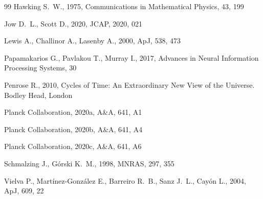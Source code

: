 \documentclass[fleqn,usenatbib]{mnras}
\begin{document}
\begin{thebibliography}{99}
Hawking S.~W.,  1975, Communications in Mathematical Physics, 43, 199

Jow D.~L., Scott D.,  2020, JCAP, 2020, 021

Lewis A., Challinor A., Lasenby A.,  2000, ApJ, 538, 473

Papamakarios G., Pavlakou T., Murray I.,  2017, Advances in Neural Information Processing Systems, 30

Penrose R.,  2010, Cycles of Time: An Extraordinary New View of the Universe. Bodley Head, London

Planck Collaboration,  2020a, A\&A, 641, A1

Planck Collaboration,  2020b, A\&A, 641, A4

Planck Collaboration,  2020c, A\&A, 641, A6

Schmalzing J., G{\'o}rski K.~M.,  1998, MNRAS, 297, 355

Vielva P., Mart{\'i}nez-Gonz{\'a}lez E., Barreiro R.~B., Sanz J.~L., Cay{\'o}n L.,  2004, ApJ, 609, 22

\makeatother
\end{thebibliography}

\bsp
\label{lastpage}
\end{document}
